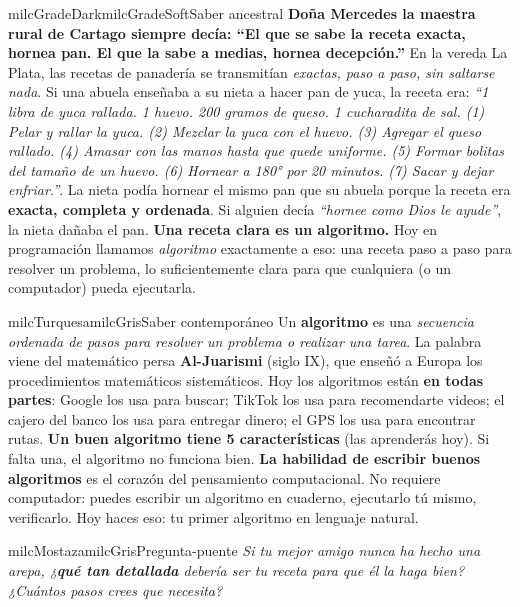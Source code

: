 \documentclass[11pt,letterpaper]{article}
\begin{document}
\begin{softbox}{milcGradeDark}{milcGradeSoft}{Saber ancestral}
\textbf{Doña Mercedes la maestra rural de Cartago siempre decía: ``El que se sabe la receta exacta, hornea pan. El que la sabe a medias, hornea decepción.''} En la vereda La Plata, las recetas de panadería se transmitían \emph{exactas, paso a paso, sin saltarse nada}. Si una abuela enseñaba a su nieta a hacer pan de yuca, la receta era: \emph{``1 libra de yuca rallada. 1 huevo. 200 gramos de queso. 1 cucharadita de sal. (1) Pelar y rallar la yuca. (2) Mezclar la yuca con el huevo. (3) Agregar el queso rallado. (4) Amasar con las manos hasta que quede uniforme. (5) Formar bolitas del tamaño de un huevo. (6) Hornear a 180° por 20 minutos. (7) Sacar y dejar enfriar.''}. La nieta podía hornear el mismo pan que su abuela porque la receta era \textbf{exacta, completa y ordenada}. Si alguien decía \emph{``hornee como Dios le ayude''}, la nieta dañaba el pan. \textbf{Una receta clara es un algoritmo.} Hoy en programación llamamos \emph{algoritmo} exactamente a eso: una receta paso a paso para resolver un problema, lo suficientemente clara para que cualquiera (o un computador) pueda ejecutarla.
\end{softbox}

\begin{softbox}{milcTurquesa}{milcGris}{Saber contemporáneo}
Un \textbf{algoritmo} es una \emph{secuencia ordenada de pasos para resolver un problema o realizar una tarea}. La palabra viene del matemático persa \textbf{Al-Juarismi} (siglo IX), que enseñó a Europa los procedimientos matemáticos sistemáticos. Hoy los algoritmos están \textbf{en todas partes}: Google los usa para buscar; TikTok los usa para recomendarte videos; el cajero del banco los usa para entregar dinero; el GPS los usa para encontrar rutas. \textbf{Un buen algoritmo tiene 5 características} (las aprenderás hoy). Si falta una, el algoritmo no funciona bien. \textbf{La habilidad de escribir buenos algoritmos} es el corazón del pensamiento computacional. No requiere computador: puedes escribir un algoritmo en cuaderno, ejecutarlo tú mismo, verificarlo. Hoy haces eso: tu primer algoritmo en lenguaje natural.
\end{softbox}

\begin{softbox}{milcMostaza}{milcGris}{Pregunta-puente}
\textit{Si tu mejor amigo nunca ha hecho una arepa, ¿\textbf{qué tan detallada} debería ser tu receta para que él la haga bien? ¿Cuántos pasos crees que necesita?}
\end{softbox}
\end{document}
